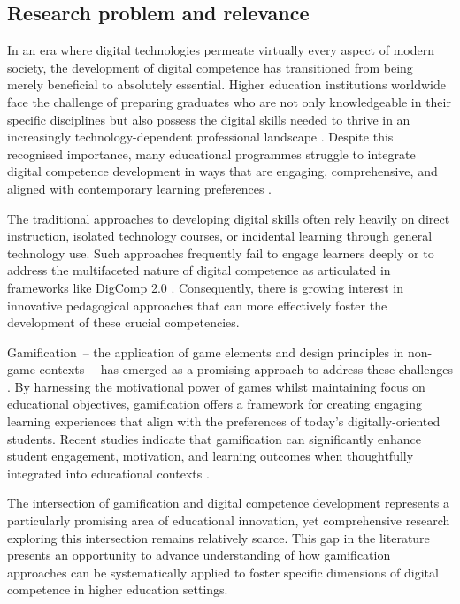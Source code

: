 \documentclass[cte]{acnsart}
\begin{document}
\subsection{Research problem and relevance}

In an era where digital technologies permeate virtually every aspect of modern society, the development of digital competence has transitioned from being merely beneficial to absolutely essential. Higher education institutions worldwide face the challenge of preparing graduates who are not only knowledgeable in their specific disciplines but also possess the digital skills needed to thrive in an increasingly technology-dependent professional landscape \cite{Barboutidis2023613}. Despite this recognised importance, many educational programmes struggle to integrate digital competence development in ways that are engaging, comprehensive, and aligned with contemporary learning preferences \cite{Guitert2023245}.

The traditional approaches to developing digital skills often rely heavily on direct instruction, isolated technology courses, or incidental learning through general technology use. Such approaches frequently fail to engage learners deeply or to address the multifaceted nature of digital competence as articulated in frameworks like DigComp 2.0 \cite{Vuorikari2016}. Consequently, there is growing interest in innovative pedagogical approaches that can more effectively foster the development of these crucial competencies.

Gamification~-- the application of game elements and design principles in non-game contexts~-- has emerged as a promising approach to address these challenges \cite{Deterding2011}. By harnessing the motivational power of games whilst maintaining focus on educational objectives, gamification offers a framework for creating engaging learning experiences that align with the preferences of today's digitally-oriented students. Recent studies indicate that gamification can significantly enhance student engagement, motivation, and learning outcomes when thoughtfully integrated into educational contexts \cite{Humeniuk2022113, Mitchell2024184}.

The intersection of gamification and digital competence development represents a particularly promising area of educational innovation, yet comprehensive research exploring this intersection remains relatively scarce. This gap in the literature presents an opportunity to advance understanding of how gamification approaches can be systematically applied to foster specific dimensions of digital competence in higher education settings.
\end{document}
